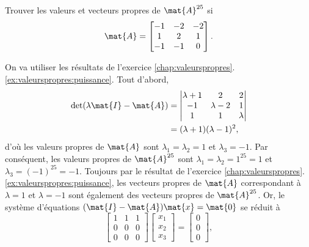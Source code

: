 \begin{exercice}
  Trouver les valeurs et vecteurs propres de $\mat{A}^{25}$ si
  \begin{displaymath}
    \mat{A} =
    \begin{bmatrix}
      -1 & -2 & -2 \\
       1 &  2 &  1 \\
      -1 & -1 &  0
    \end{bmatrix}.
  \end{displaymath}
  \begin{sol}
    On va utiliser les résultats de l'exercice
    \ref{chap:valeurspropres}.\ref{ex:valeurspropres:puissance}. Tout d'abord,
    \begin{align*}
      \det(\lambda \mat{I} - \mat{A})
      &= \begin{vmatrix}
        \lambda + 1 & 2 & 2 \\
        -1 &  \lambda - 2 &  1 \\
        1 & 1 & \lambda
      \end{vmatrix} \\
      &= (\lambda + 1)(\lambda - 1)^2,
    \end{align*}
    d'où les valeurs propres de $\mat{A}$ sont $\lambda_1 = \lambda_2
    = 1$ et $\lambda_3 = -1$. Par conséquent, les valeurs propres de
    $\mat{A}^{25}$ sont $\lambda_1 = \lambda_2 = 1^{25} = 1$ et
    $\lambda_3 = (-1)^{25} = -1$.  Toujours par le résultat de
    l'exercice \ref{chap:valeurspropres}.\ref{ex:valeurspropres:puissance}, les vecteurs propres
    de $\mat{A}$ correspondant à $\lambda = 1$ et $\lambda = -1$ sont
    également des vecteurs propres de $\mat{A}^{25}$. Or, le système
    d'équations $(\mat{I} - \mat{A}) \mat{x} = \mat{0}$ se réduit à
      \begin{displaymath}
        \begin{bmatrix}
          1 &  1 & 1 \\
          0 &  0 & 0 \\
          0 &  0 & 0
        \end{bmatrix}
        \begin{bmatrix} x_1 \\ x_2 \\ x_3 \end{bmatrix} =
        \begin{bmatrix} 0 \\ 0 \\ 0 \end{bmatrix},
      \end{displaymath}

\end{sol}
\end{exercice}
